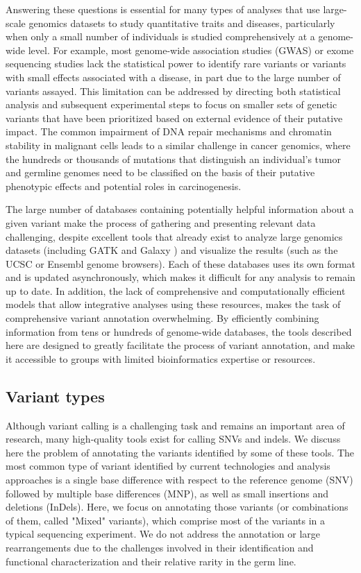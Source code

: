 Answering these questions is essential for many types of analyses that use large-scale genomics datasets to study quantitative traits and diseases, particularly when only a small number of individuals is studied comprehensively at a genome-wide level. For example, most genome-wide association studies (GWAS) or exome sequencing studies lack the statistical power to identify rare variants or variants with small effects associated with a disease, in part due to the large number of variants assayed. This limitation can be addressed by directing both statistical analysis and subsequent experimental steps to focus on smaller sets of genetic variants that have been prioritized based on external evidence of their putative impact. The common impairment of DNA repair mechanisms and chromatin stability in malignant cells leads to a similar challenge in cancer genomics, where the hundreds or thousands of mutations that distinguish an individual's tumor and germline genomes need to be classified on the basis of their putative phenotypic effects and potential roles in carcinogenesis.

The large number of databases containing potentially helpful information about a given variant make the process of gathering and presenting relevant data challenging, despite excellent tools that already exist to analyze large genomics datasets (including GATK \cite{mckenna2010genome} and Galaxy \cite{goecks2010galaxy}) and visualize the results (such as the UCSC \cite{karolchik2014ucsc} or Ensembl \cite{flicek2012ensembl} genome browsers). Each of these databases uses its own format and is updated asynchronously, which makes it difficult for any analysis to remain up to date. In addition, the lack of comprehensive and computationally efficient models that allow integrative analyses using these resources, makes the task of comprehensive variant annotation overwhelming. By efficiently combining information from tens or hundreds of genome-wide databases, the tools described here are designed to greatly facilitate the process of variant annotation, and make it accessible to groups with limited bioinformatics expertise or resources.

\subsection{Variant types}

Although variant calling is a challenging task and remains an important area of research, many high-quality tools exist for calling SNVs and indels.
We discuss here the problem of annotating the variants identified by some of these tools.
The most common type of variant identified by current technologies and analysis approaches is a single base difference with respect to the reference genome (SNV) followed by multiple base differences (MNP), as well as small insertions and deletions (InDels). Here, we focus on annotating those variants (or combinations of them, called "Mixed" variants), which comprise most of the variants in a typical sequencing experiment. We do not address the annotation or large rearrangements due to the challenges involved in their identification and functional characterization and their relative rarity in the germ line.

